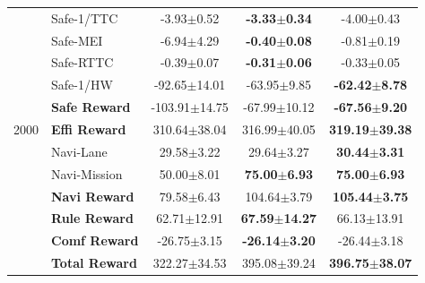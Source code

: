 {\begin{longtable}{l l c c c}
  \multirow{11}{*}{2000}
  & Safe-1/TTC       & -3.93$\pm$0.52 & \textbf{-3.33$\pm$0.34} & -4.00$\pm$0.43 \\
  & Safe-MEI         & -6.94$\pm$4.29 & \textbf{-0.40$\pm$0.08} & -0.81$\pm$0.19 \\
  & Safe-RTTC        & -0.39$\pm$0.07 & \textbf{-0.31$\pm$0.06} & -0.33$\pm$0.05 \\
  & Safe-1/HW        & -92.65$\pm$14.01 & -63.95$\pm$9.85 & \textbf{-62.42$\pm$8.78} \\
  & \textbf{Safe Reward} & -103.91$\pm$14.75 & -67.99$\pm$10.12 & \textbf{-67.56$\pm$9.20} \\
  & \textbf{Effi Reward} & 310.64$\pm$38.04 & 316.99$\pm$40.05 & \textbf{319.19$\pm$39.38} \\
  & Navi-Lane        & 29.58$\pm$3.22 & 29.64$\pm$3.27 & \textbf{30.44$\pm$3.31} \\
  & Navi-Mission     & 50.00$\pm$8.01 & \textbf{75.00$\pm$6.93} & \textbf{75.00$\pm$6.93} \\
  & \textbf{Navi Reward} & 79.58$\pm$6.43 & 104.64$\pm$3.79 & \textbf{105.44$\pm$3.75} \\
  & \textbf{Rule Reward} & 62.71$\pm$12.91 & \textbf{67.59$\pm$14.27} & 66.13$\pm$13.91 \\
  & \textbf{Comf Reward} & -26.75$\pm$3.15 & \textbf{-26.14$\pm$3.20} & -26.44$\pm$3.18 \\
  & \textbf{Total Reward} & 322.27$\pm$34.53 & 395.08$\pm$39.24 & \textbf{396.75$\pm$38.07} \\
  \midrule


\end{longtable}}
